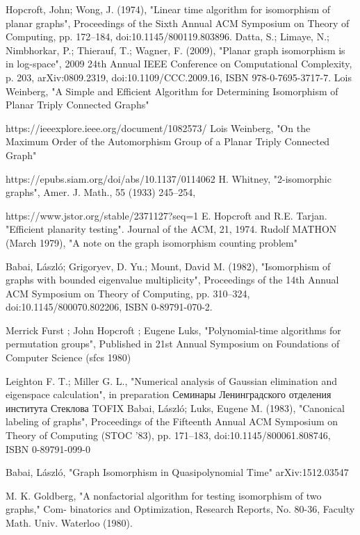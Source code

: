 \begin{thebibliography}{99}
     Hopcroft, John; Wong, J. (1974), 
    "Linear time algorithm for isomorphism of planar graphs", 
    Proceedings of the Sixth Annual ACM Symposium on Theory of Computing, 
    pp. 172–184, doi:10.1145/800119.803896.
     Datta, S.; Limaye, N.; Nimbhorkar, P.; Thierauf, T.; Wagner, F. (2009), 
    "Planar graph isomorphism is in log-space", 
    2009 24th Annual IEEE Conference on Computational Complexity, 
    p. 203, arXiv:0809.2319, doi:10.1109/CCC.2009.16, ISBN 978-0-7695-3717-7.
     Lois Weinberg,
    "A Simple and Efficient Algorithm for Determining Isomorphism  of Planar Triply Connected Graphs"
    
    https://ieeexplore.ieee.org/document/1082573/
     Lois Weinberg,
    "On the Maximum Order of the Automorphism Group of a Planar Triply Connected Graph"
    
    https://epubs.siam.org/doi/abs/10.1137/0114062
      H. Whitney, 
    "2-isomorphic graphs",  
    Amer. J. Math., 55 (1933) 245–254, 

    https://www.jstor.org/stable/2371127?seq=1
     E. Hopcroft and R.E. Tarjan. 
    "Efficient planarity testing".
    Journal of the ACM, 21, 1974.
     Rudolf MATHON (March 1979),
    "A note on the graph isomorphism counting problem"

     Babai, László; Grigoryev, D. Yu.; Mount, David M. (1982), 
    "Isomorphism of graphs with bounded eigenvalue multiplicity", 
    Proceedings of the 14th Annual ACM Symposium on Theory of Computing, 
    pp. 310–324, doi:10.1145/800070.802206, ISBN 0-89791-070-2.
    
     Merrick Furst ; John Hopcroft ; Eugene Luks,
    "Polynomial-time algorithms for permutation groups",
    Published in 21st Annual Symposium on Foundations of Computer Science (sfcs 1980)
    
     Leighton F. T.; Miller G. L.,
    "Numerical analysis of Gaussian elimination and eigenspace calculation",
    in preparation
     Семинары Ленинградского отделения института Стеклова TOFIX 
     Babai, László; Luks, Eugene M. (1983), 
    "Canonical labeling of graphs", 
    Proceedings of the Fifteenth Annual ACM Symposium on Theory of Computing (STOC '83), 
    pp. 171–183, doi:10.1145/800061.808746, ISBN 0-89791-099-0

     Babai, László, 
    "Graph Isomorphism in Quasipolynomial Time"
    arXiv:1512.03547

     M. K. Goldberg, 
    "A nonfactorial algorithm for testing isomorphism of two graphs," 
    Com- binatorics and Optimization, Research Reports, No. 80-36, 
    Faculty Math. Univ. Waterloo (1980).

\end{thebibliography}